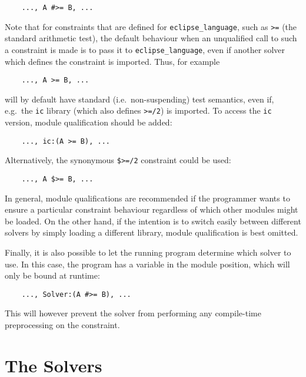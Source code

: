 \begin{verbatim}
    ..., A #>= B, ...
\end{verbatim}

Note that for constraints that are defined for \verb'eclipse_language',
such as \verb'>=' (the standard arithmetic test), the default behaviour
when an unqualified call to such a
constraint is made is to pass it to \verb'eclipse_language',
even if another solver which defines the constraint is imported.
Thus, for example
\begin{verbatim}
    ..., A >= B, ...
\end{verbatim}

\noindent
will by default have standard (i.e.\ non-suspending) test semantics, even
if, e.g.\ the \verb'ic' library (which also defines \verb'>=/2') is
imported. To access the \verb'ic' version, module qualification should
be added:
\begin{verbatim}
    ..., ic:(A >= B), ...
\end{verbatim}
Alternatively, the synonymous \verb'$>=/2' constraint could be used:
\begin{verbatim}
    ..., A $>= B, ...
\end{verbatim}

In general, module qualifications are recommended if the programmer
wants to ensure a particular constraint behaviour regardless of which
other modules might be loaded.  On the other hand, if the intention is
to switch easily between different solvers by simply loading a
different library, module qualification is best omitted.

Finally, it is also possible to let the running program determine which
solver to use. In this case, the program has a variable in the module
position, which will only be bound at runtime:
\begin{verbatim}
    ..., Solver:(A #>= B), ...
\end{verbatim}
This will however prevent the solver from performing any compile-time
preprocessing on the constraint.



\section{The Solvers}


